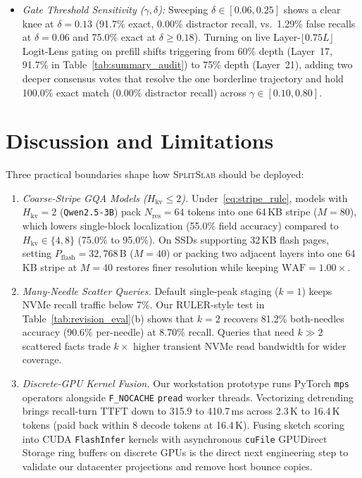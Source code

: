 \documentclass[pdflatex,sn-mathphys-num]{sn-jnl}
\theoremstyle{thmstyleone}
\newcommand{\SplitSlab}{\textsc{SplitSlab}}
\newcommand{\WAF}{\mathrm{WAF}}
\begin{document}
\begin{itemize}
  \item \emph{Gate Threshold Sensitivity ($\gamma, \delta$):} Sweeping $\delta \in [0.06, 0.25]$ shows a clear knee at $\delta = 0.13$ (91.7\% exact, 0.00\% distractor recall, vs.\ 1.29\% false recalls at $\delta = 0.06$ and 75.0\% exact at $\delta \ge 0.18$). Turning on live Layer-$\lfloor 0.75 L \rfloor$ Logit-Lens gating on prefill shifts triggering from 60\% depth (Layer~17, 91.7\% in Table~\ref{tab:summary_audit}) to 75\% depth (Layer~21), adding two deeper consensus votes that resolve the one borderline trajectory and hold 100.0\% exact match (0.00\% distractor recall) across $\gamma \in [0.10, 0.80]$.
\end{itemize}

\section{Discussion and Limitations}\label{sec:limits}

Three practical boundaries shape how \SplitSlab{} should be deployed:
\begin{enumerate}
  \item \emph{Coarse-Stripe GQA Models ($H_{\mathrm{kv}} \le 2$).} Under~\eqref{eq:stripe_rule}, models with $H_{\mathrm{kv}} = 2$ (\texttt{Qwen2.5-3B}) pack $N_{\mathrm{res}} = 64$ tokens into one 64\,KB stripe ($M = 80$), which lowers single-block localization (55.0\% field accuracy) compared to $H_{\mathrm{kv}} \in \{4, 8\}$ (75.0\% to 95.0\%). On SSDs supporting 32\,KB flash pages, setting $P_{\mathrm{flash}} = 32{,}768$\,B ($M = 40$) or packing two adjacent layers into one 64\,KB stripe at $M = 40$ restores finer resolution while keeping $\WAF = 1.00\times$.
  \item \emph{Many-Needle Scatter Queries.} Default single-peak staging ($k=1$) keeps NVMe recall traffic below 7\%. Our RULER-style test in Table~\ref{tab:revision_eval}(b) shows that $k=2$ recovers 81.2\% both-needles accuracy (90.6\% per-needle) at 8.70\% recall. Queries that need $k \gg 2$ scattered facts trade $k\times$ higher transient NVMe read bandwidth for wider coverage.
  \item \emph{Discrete-GPU Kernel Fusion.} Our workstation prototype runs PyTorch \texttt{mps} operators alongside \texttt{F\_NOCACHE} \texttt{pread} worker threads. Vectorizing detrending brings recall-turn TTFT down to 315.9 to 410.7\,ms across 2.3\,K to 16.4\,K tokens (paid back within 8 decode tokens at 16.4\,K). Fusing sketch scoring into CUDA \texttt{FlashInfer} kernels with asynchronous \texttt{cuFile} GPUDirect Storage ring buffers on discrete GPUs is the direct next engineering step to validate our datacenter projections and remove host bounce copies.
\end{enumerate}
\end{document}

